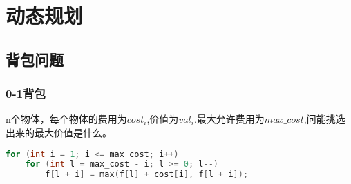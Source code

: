 \section{动态规划}
		\subsection{背包问题}
			\subsubsection{0-1背包}
				\par n个物体，每个物体的费用为$cost_i$,价值为$val_i$.最大允许费用为$max\_cost$,问能挑选出来的最大价值是什么。
				\begin{lstlisting}[language={c++}]
for (int i = 1; i <= max_cost; i++)
	for (int l = max_cost - i; l >= 0; l--)
		f[l + i] = max(f[l] + cost[i], f[l + i]);		
				\end{lstlisting}
